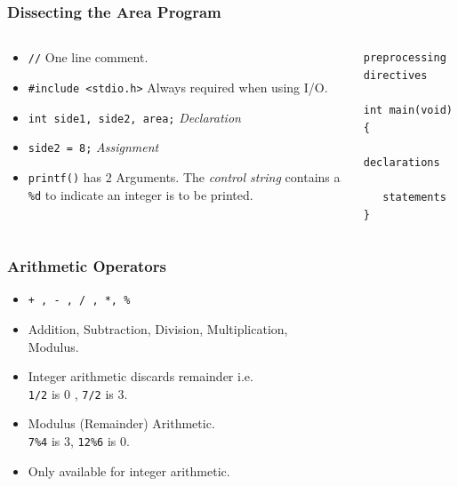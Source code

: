 \begin{frame}[fragile]
\frametitle{Dissecting the Area Program}

\begin{columns}
\begin{column}{0.40\textwidth}
\begin{itemize}[<+->]
\item \verb^//^ One line comment.
\item \verb^#include <stdio.h>^ Always required when using I/O.
\item \verb^int side1, side2, area;^ {\it Declaration}
\item \verb^side2 = 8;^ {\it  Assignment }
\item \verb^printf()^ has 2 Arguments.
The {\it control string}
contains a \verb+%d+ to indicate an integer is to be printed.
\end{itemize}
\end{column}

\pause
\begin{column}{0.55\textwidth}
\begin{lstlisting}[style=basicc]
preprocessing directives

int main(void)
{
   declarations

   statements
}
\end{lstlisting}
\end{column}

\end{columns}
\end{frame}




\begin{frame}[fragile]
\frametitle{Arithmetic Operators}

\begin{itemize}[<+->]
\item \verb^+ , - , / , *, %^
\item Addition, Subtraction, Division, Multiplication,\\ Modulus.
\item Integer arithmetic discards remainder i.e.\\
\verb+1/2+ is 0 , \verb+7/2+ is 3.
\item Modulus (Remainder) Arithmetic.\\
\verb+7%4+ is 3, \verb+12%6+ is 0.

\item
Only available for integer arithmetic.
\end{itemize}
\end{frame}



